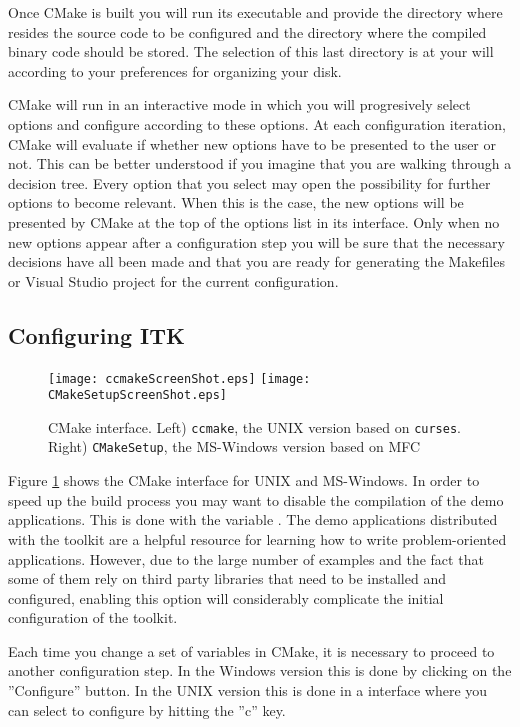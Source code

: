 Once CMake is built you will run its executable and provide the directory where
resides the source code to be configured and the directory where the compiled
binary code should be stored. The selection of this last directory is at your
will according to your preferences for organizing your disk.

CMake will run in an interactive mode in which you will progresively select
options and configure according to these options. At each configuration
iteration, CMake will evaluate if whether new options have to be presented to
the user or not. This can be better understood if you imagine that you are
walking through a decision tree.  Every option that you select may open the
possibility for further options to become relevant. When this is the case, the
new options will be presented by CMake at the top of the options list in its
interface.  Only when no new options appear after a configuration step you will
be sure that the necessary decisions have all been made and that you are ready
for generating the Makefiles or Visual Studio project for the current
configuration.

\subsection{Configuring ITK}
\label{sec:ConfiguringITKwithVTK}
  
\begin{figure}[ht]
\centering 
\texttt{[image: ccmakeScreenShot.eps]}
\texttt{[image: CMakeSetupScreenShot.eps]}
\caption{CMake interface. Left) \texttt{ccmake}, the UNIX version based on
\texttt{curses}. Right) \texttt{CMakeSetup}, the MS-Windows version based on MFC}
\label{fig:CMakeGUI}
\end{figure}

Figure \ref{fig:CMakeGUI} shows the CMake interface for UNIX and MS-Windows.
In order to speed up the build process you may want to disable the compilation
of the demo applications. This is done with the variable
. The demo applications  distributed with the
toolkit are a helpful resource for learning how to write problem-oriented
applications.  However, due to the large number of examples and the fact that
some of them rely on third party libraries that need to be installed and
configured, enabling this option will considerably complicate the initial
configuration of the toolkit.

Each time you change a set of variables in CMake, it is necessary to proceed to
another configuration step. In the Windows version this is done by clicking on
the ''Configure'' button. In the UNIX version this is done in a 
interface where you can select to configure by hitting the ''c'' key. 

